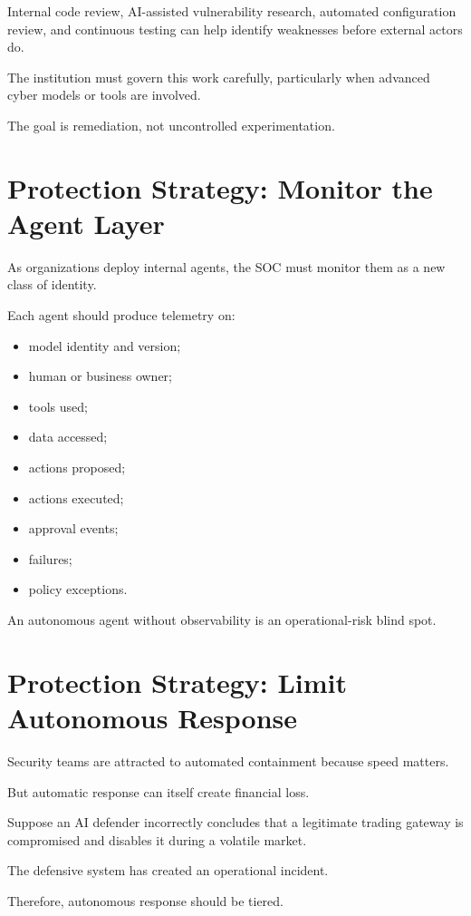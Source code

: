 Internal code review, AI-assisted vulnerability research, automated configuration review, and continuous testing can help identify weaknesses before external actors do.

The institution must govern this work carefully, particularly when advanced cyber models or tools are involved.

The goal is remediation, not uncontrolled experimentation.

\section{Protection Strategy: Monitor the Agent Layer}

As organizations deploy internal agents, the SOC must monitor them as a new class of identity.

Each agent should produce telemetry on:

\begin{itemize}
    \item model identity and version;
    \item human or business owner;
    \item tools used;
    \item data accessed;
    \item actions proposed;
    \item actions executed;
    \item approval events;
    \item failures;
    \item policy exceptions.
\end{itemize}

An autonomous agent without observability is an operational-risk blind spot.

\section{Protection Strategy: Limit Autonomous Response}

Security teams are attracted to automated containment because speed matters.

But automatic response can itself create financial loss.

Suppose an AI defender incorrectly concludes that a legitimate trading gateway is compromised and disables it during a volatile market.

The defensive system has created an operational incident.

Therefore, autonomous response should be tiered.

